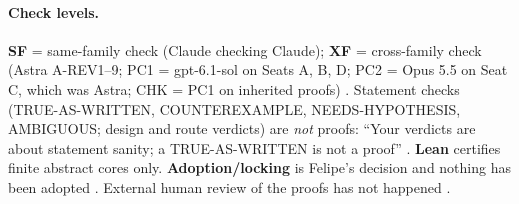 \paragraph{Check levels.} \textbf{SF} = same-family check (Claude checking Claude); \textbf{XF} = cross-family check (Astra A-REV1--9; PC1 = gpt-6.1-sol on Seats A, B, D; PC2 = Opus 5.5 on Seat C, which was Astra; CHK = PC1 on inherited proofs) . Statement checks (TRUE-AS-WRITTEN, COUNTEREXAMPLE, NEEDS-HYPOTHESIS, AMBIGUOUS; design and route verdicts) are \emph{not} proofs: ``Your verdicts are about statement sanity; a TRUE-AS-WRITTEN is not a proof'' . \textbf{Lean} certifies finite abstract cores only. \textbf{Adoption/locking} is Felipe's decision and nothing has been adopted . External human review of the proofs has not happened .

